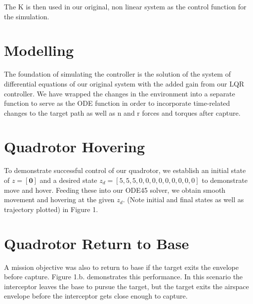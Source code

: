\documentclass{article}
\begin{document}
\begin{multicols}{2}
\noindent The K is then used in our original, non linear system as the control function for the simulation.  
\bigskip
\section*{Modelling}

\noindent
The foundation of simulating the controller is the solution of the system of differential equations of our original system with the added gain from our LQR controller.  We have wrapped the changes in the environment into a separate function to serve as the ODE function in order to incorporate time-related changes to the target path as well as n and r forces and torques after capture.
\section*{Quadrotor Hovering}
To demonstrate successful control of our quadrotor, we establish an initial state of $z=[\mathbf{0}]$ and a desired state $z_d=[5,5,5,0,0,0,0,0,0,0,0,0] $ to demonstrate move and hover.  Feeding these into our ODE45 solver, we obtain smooth movement and hovering at the given $z_d$.  (Note initial and final states as well as trajectory plotted) in Figure 1.
\section*{Quadrotor Return to Base}
A mission objective was also to return to base if the target exits the envelope before capture.  Figure 1.b. demonstrates this performance. In this scenario the interceptor leaves the base to pursue the target, but the target exits the airspace envelope before the interceptor gets close enough to capture.


\end{multicols}
\end{document}
